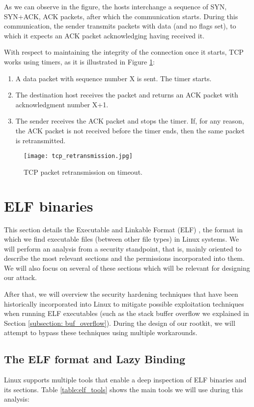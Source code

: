As we can observe in the figure, the hosts interchange a sequence of SYN, SYN+ACK, ACK packets, after which the communication starts. During this communication, the sender transmits packets with data (and no flags set), to which it expects an ACK packet acknowledging having received it.

With respect to maintaining the integrity of the connection once it starts, TCP works using timers, as it is illustrated in Figure \ref{fig:tcp_retransmission}:
\begin{enumerate}
\item A data packet with sequence number X is sent. The timer starts.
\item The destination host receives the packet and returns an ACK packet with acknowledgment number X+1.
\item The sender receives the ACK packet and stops the timer. If, for any reason, the ACK packet is not received before the timer ends, then the same packet is retransmitted.
\end{enumerate}

\begin{figure}[htbp]
	\centering
	\texttt{[image: tcp\_retransmission.jpg]}
	\caption{TCP packet retransmission on timeout.}
	\label{fig:tcp_retransmission}
\end{figure}

\section{ELF binaries} \label{section:elf}
This section details the Executable and Linkable Format (ELF) \cite{elf}, the format in which we find executable files (between other file types) in Linux systems. We will perform an analysis from a security standpoint, that is, mainly oriented to describe the most relevant sections and the permissions incorporated into them. We will also focus on several of these sections which will be relevant for designing our attack.

After that, we will overview the security hardening techniques that have been historically incorporated into Linux to mitigate possible exploitation techniques when running ELF executables (such as the stack buffer overflow we explained in Section \ref{subsection: buf_overflow}). During the design of our rootkit, we will attempt to bypass these techniques using multiple workarounds.

\subsection{The ELF format and Lazy Binding} \label{subsection:elf_lazy_binding}
Linux supports multiple tools that enable a deep inspection of ELF binaries and its sections. Table \ref{table:elf_tools} shows the main tools we will use during this analysis:

